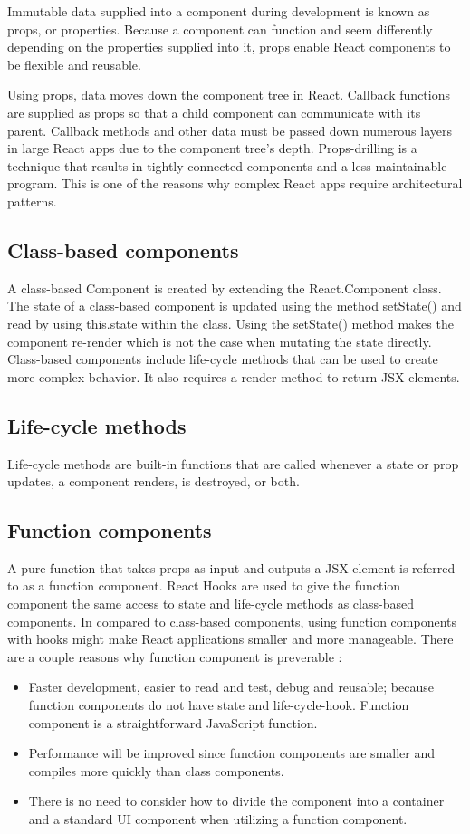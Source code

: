 Immutable data supplied into a component during development is known as props, or properties. Because a component can function and seem differently depending on the properties supplied into it, props enable React components to be flexible and reusable.

Using props, data moves down the component tree in React. Callback functions are supplied as props so that a child component can communicate with its parent. Callback methods and other data must be passed down numerous layers in large React apps due to the component tree's depth. Props-drilling is a technique that results in tightly connected components and a less maintainable program. This is one of the reasons why complex React apps require architectural patterns.

\subsection*{Class-based components}
A class-based Component is created by extending the React.Component class. The state of a class-based component is updated using the method setState() and read by using this.state within the class. Using the setState() method makes the component re-render which is not the case when mutating the state directly. Class-based components include life-cycle methods that can be used to create more complex behavior. It also requires a render method to return JSX elements.

\subsection*{Life-cycle methods}
Life-cycle methods are built-in functions that are called whenever a state or prop updates, a component renders, is destroyed, or both.

\subsection*{Function components}
A pure function that takes props as input and outputs a JSX element is referred to as a function component. React Hooks are used to give the function component the same access to state and life-cycle methods as class-based components. In compared to class-based components, using function components with hooks might make React applications smaller and more manageable. There are a couple reasons why function component is preverable \autocite{phan2020react}:

\begin{itemize}
  \item Faster development, easier to read and test, debug and reusable; because function components do not have state and life-cycle-hook. Function component is a straightforward JavaScript function.
  \item Performance will be improved since function components are smaller and compiles more quickly than class components.
  \item There is no need to consider how to divide the component into a container and a standard UI component when utilizing a function component.
\end{itemize}

